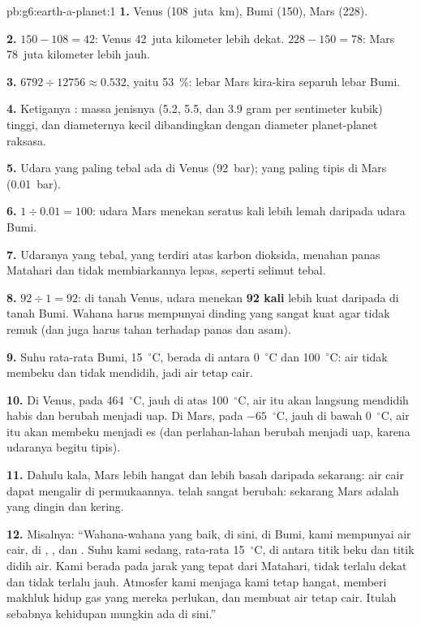 \begin{solution}{pb:g6:earth-a-planet:1}
\textbf{1.} Venus (108~juta~km), Bumi (150), Mars (228).

\textbf{2.} $150 - 108 = 42$: Venus 42~juta kilometer lebih dekat.
$228 - 150 = 78$: Mars 78~juta kilometer lebih jauh.

\textbf{3.} $6792 \div 12756 \approx 0.532$, yaitu 53~\%: lebar Mars
kira-kira separuh lebar Bumi.

\textbf{4.} Ketiganya : massa jenisnya (5.2, 5.5, dan 3.9
gram per sentimeter kubik) tinggi, dan diameternya kecil dibandingkan
dengan diameter planet-planet raksasa.

\textbf{5.} Udara yang paling tebal ada di Venus (92~bar); yang paling
tipis di Mars (0.01~bar).

\textbf{6.} $1 \div 0.01 = 100$: udara Mars menekan seratus kali lebih
lemah daripada udara Bumi.

\textbf{7.} Udaranya yang tebal, yang terdiri atas karbon dioksida, menahan
panas Matahari dan tidak membiarkannya lepas, seperti selimut tebal.

\textbf{8.} $92 \div 1 = 92$: di tanah Venus, udara menekan
\textbf{92 kali} lebih kuat daripada di tanah Bumi. Wahana harus mempunyai
dinding yang sangat kuat agar tidak remuk (dan juga harus tahan terhadap
panas dan  asam).

\textbf{9.} Suhu rata-rata Bumi, 15~$^\circ$C, berada di antara
0~$^\circ$C dan 100~$^\circ$C: air tidak membeku dan tidak mendidih, jadi
air tetap cair.

\textbf{10.} Di Venus, pada 464~$^\circ$C, jauh di atas 100~$^\circ$C,
air itu akan langsung mendidih habis dan berubah menjadi uap. Di Mars, pada
$-65$~$^\circ$C, jauh di bawah 0~$^\circ$C, air itu akan membeku menjadi es
(dan perlahan-lahan berubah menjadi uap, karena udaranya begitu tipis).

\textbf{11.} Dahulu kala, Mars lebih hangat dan lebih basah daripada
sekarang: air cair dapat mengalir di permukaannya.  telah sangat
berubah: sekarang Mars adalah  yang dingin dan kering.

\textbf{12.} Misalnya: ``Wahana-wahana yang baik, di sini, di Bumi, kami
mempunyai air cair, di , , dan . Suhu kami sedang,
rata-rata 15~$^\circ$C, di antara titik beku dan titik didih air. Kami
berada pada jarak yang tepat dari Matahari, tidak terlalu dekat dan tidak
terlalu jauh. Atmosfer kami menjaga kami tetap hangat, memberi makhluk hidup
gas yang mereka perlukan, dan membuat air tetap cair. Itulah sebabnya
kehidupan mungkin ada di sini.''
\end{solution}
